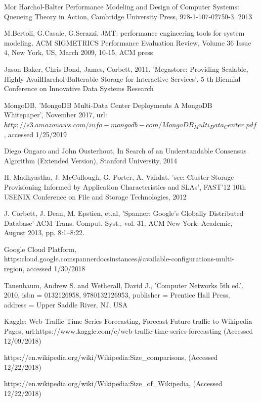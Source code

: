 \documentclass[conference]{IEEEtran}
\begin{document}
\begin{thebibliography}{00}
 Mor Harchol-Balter Performance Modeling and Design of Computer Systems: Queueing Theory in Action, Cambridge University Press, 978-1-107-02750-3, 2013

M.Bertoli, G.Casale, G.Serazzi.
JMT: performance engineering tools for system modeling.
ACM SIGMETRICS Performance Evaluation Review, Volume 36 Issue 4, New York, US, March 2009, 10-15, ACM press

 Jason Baker, Chris Bond, James, Corbett, 2011. 'Megastore: Providing Scalable, Highly Avail{Harchol-Balter}able Storage for Interactive Services', 5
th Biennial Conference on Innovative Data Systems Research

MongoDB, 'MongoDB Multi-Data Center Deployments A MongoDB Whitepaper', November 2017, url:$http://s3.amazonaws.com/info-mongodb-com/MongoDB_Multi_Data_Center.pdf$, accessed 1/25/2019

 Diego Ongaro and John Ousterhout, In Search of an Understandable Consensus Algorithm
(Extended Version), Stanford University, 2014

 H. Madhyastha, J. McCullough, G. Porter, A. Vahdat. 'scc: Cluster Storage Provisioning Informed by Application Characteristics and SLAs', FAST'12 10th USENIX Conference on File and Storage Technologies, 2012

 J. Corbett, J. Dean, M. Epstien, et.al, 'Spanner: Google’s Globally Distributed Database' ACM Trans. Comput. Syst., vol. 31, ACM New York: Academic, August 2013, pp. 8:1--8:22.

 Google Cloud Platform, \\
https:\/\/cloud.google.com\/spanner\/docs\/instances\#available-configurations-multi-region,
accessed 1/30/2018

Tanenbaum, Andrew S. and Wetherall, David J., 'Computer Networks 5th ed.', 2010, isbn = {0132126958, 9780132126953},
publisher = Prentice Hall Press, address = Upper Saddle River, NJ, USA

Kaggle: Web Traffic Time Series Forecasting, Forecast Future traffic to Wikipedia Pages, url:https://www.kaggle.com/c/web-traffic-time-series-forecasting (Accessed 12/09/2018)

https://en.wikipedia.org/wiki/Wikipedia:Size\_comparisons, (Accessed 12/22/2018)

https://en.wikipedia.org/wiki/Wikipedia:Size\_of\_Wikipedia, (Accessed 12/22/2018)


\end{thebibliography}
\end{document}
